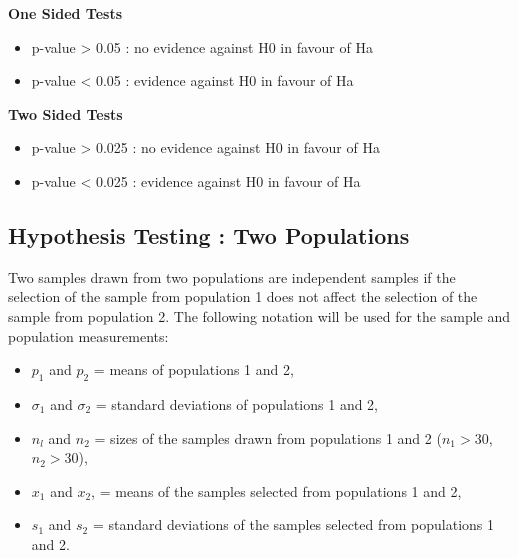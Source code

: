 \begin{framed}	
	\textbf{One Sided Tests}
	\begin{itemize}
		\item 		p-value  >  0.05   :   no evidence against H0 in favour of Ha
		
		\item 	p-value    <  0.05   :   evidence against H0 in favour of Ha
	\end{itemize}	
	\textbf{Two Sided Tests}
	\begin{itemize}
		\item 	p-value    >  0.025   :   no evidence against H0 in favour of Ha
		
		\item 	p-value    <  0.025   :   evidence against H0 in favour of Ha
	\end{itemize}		
\end{framed}





\subsection{Hypothesis Testing : Two Populations}

Two samples drawn from two populations are independent samples if
the selection of the sample from population 1 does not affect the
selection of the sample from population 2. The following notation
will be used for the sample and population measurements:

\begin{itemize}
	\item $p_1$ and $p_2$ = means of populations 1 and 2,
	
	\item $\sigma_1$ and $\sigma_2$ = standard deviations of
	populations 1 and 2,
	
	\item $n_l$ and $n_2$ = sizes of the samples drawn from
	populations 1 and 2 ($n_1 >30 $, $n_2 >30 $),
	
	\item $x_1$ and $x_2$, = means of the samples selected from
	populations 1 and 2,
	
	\item $s_{1}$ and $s_{2}$ = standard deviations of the samples
	selected from populations 1 and 2.
	
\end{itemize}

	


